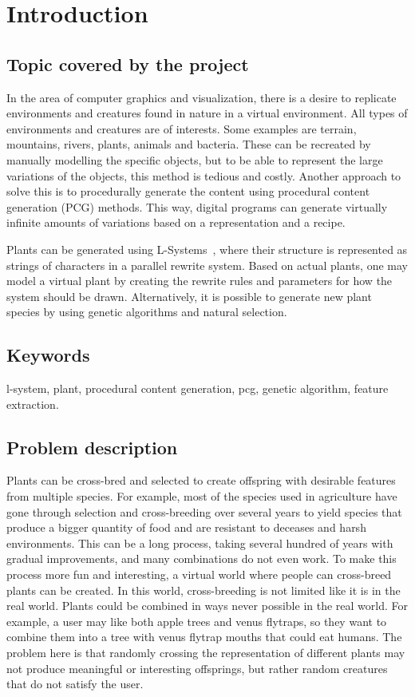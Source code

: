 \chapter{Introduction}
\label{chap:introduction}

\section{Topic covered by the project}
In the area of computer graphics and visualization, there is a desire to replicate environments and creatures found in nature in a virtual environment.
All types of environments and creatures are of interests.
Some examples are terrain, mountains, rivers, plants, animals and bacteria.
These can be recreated by manually modelling the specific objects, but to be able to represent the large variations of the objects, this method is tedious and costly.
Another approach to solve this is to procedurally generate the content using procedural content generation (PCG) methods.
This way, digital programs can generate virtually infinite amounts of variations based on a representation and a recipe.

Plants can be generated using L-Systems~\cite{Prusinkiewicz2012}, where their structure is represented as strings of characters in a parallel rewrite system.
Based on actual plants, one may model a virtual plant by creating the rewrite rules and parameters for how the system should be drawn.
Alternatively, it is possible to generate new plant species by using genetic algorithms and natural selection.

\section{Keywords}
l-system, plant, procedural content generation, pcg, genetic algorithm, feature extraction.

\section{Problem description}
\label{sec:ProblemDescription}
Plants can be cross-bred and selected to create offspring with desirable features from multiple species.
For example, most of the species used in agriculture have gone through selection and cross-breeding over several years to yield species that produce a bigger quantity of food and are resistant to deceases and harsh environments.
This can be a long process, taking several hundred of years with gradual improvements, and many combinations do not even work.
To make this process more fun and interesting, a virtual world where people can cross-breed plants can be created.
In this world, cross-breeding is not limited like it is in the real world.
Plants could be combined in ways never possible in the real world.
For example, a user may like both apple trees and venus flytraps, so they want to combine them into a tree with venus flytrap mouths that could eat humans.
The problem here is that randomly crossing the representation of different plants may not produce meaningful or interesting offsprings, but rather random creatures that do not satisfy the user.

